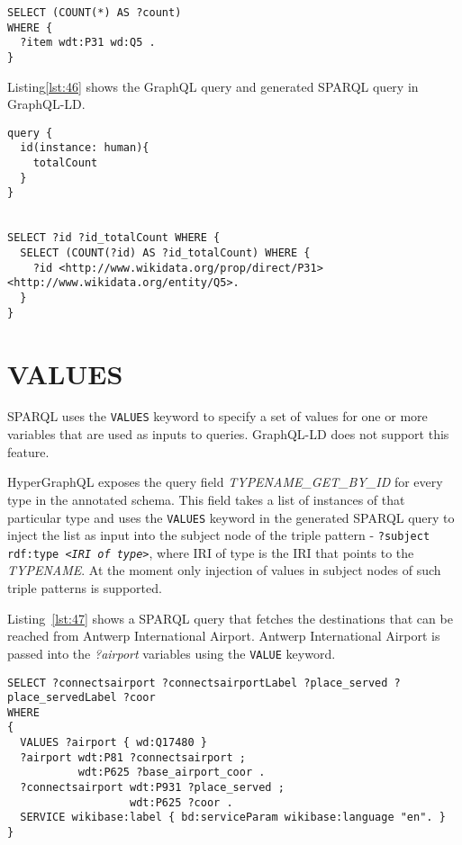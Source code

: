 \begin{minipage}{\linewidth}
\begin{lstlisting}[label=lst:45, caption={SPARQL query showing usage of COUNT}, language=SPARQL]
SELECT (COUNT(*) AS ?count)
WHERE {
  ?item wdt:P31 wd:Q5 .
}
\end{lstlisting}
\end{minipage}

Listing\ref{lst:46} shows the GraphQL query and generated SPARQL query in GraphQL-LD. 

\begin{minipage}{\linewidth}
\begin{lstlisting}[label=lst:46, caption={GraphQL query and generated SPARQL query in GraphQL-LD}, language=SPARQL]
query {
  id(instance: human){
    totalCount
  }
}


SELECT ?id ?id_totalCount WHERE { 
  SELECT (COUNT(?id) AS ?id_totalCount) WHERE { 
    ?id <http://www.wikidata.org/prop/direct/P31> <http://www.wikidata.org/entity/Q5>. 
  } 
}
\end{lstlisting}
\end{minipage}


\section{VALUES}

SPARQL uses the \texttt{VALUES} keyword to specify a set of values for one or more variables that are used as inputs to queries. GraphQL-LD does not support this feature. 

HyperGraphQL exposes the query field \textit{TYPENAME\_GET\_BY\_ID} for every type in the annotated schema. This field takes a list of instances of that particular type and uses the \texttt{VALUES} keyword in the generated SPARQL query to inject the list as input into the subject node of the triple pattern - \texttt{?subject rdf:type \textit{<IRI of type>}}, where IRI of type is the IRI that points to the \textit{TYPENAME}. At the moment only injection of values in subject nodes of such triple patterns is supported.

Listing~\ref{lst:47} shows a SPARQL query that fetches the destinations that can be reached from Antwerp International Airport. Antwerp International Airport is passed into the \textit{?airport} variables using the \texttt{VALUE} keyword.


\begin{minipage}{\linewidth}
\begin{lstlisting}[label=lst:47, caption={SPARQL query showing usage of VALUES}, language=SPARQL]
SELECT ?connectsairport ?connectsairportLabel ?place_served ?place_servedLabel ?coor
WHERE
{
  VALUES ?airport { wd:Q17480 }  
  ?airport wdt:P81 ?connectsairport ;
           wdt:P625 ?base_airport_coor .
  ?connectsairport wdt:P931 ?place_served ;
                   wdt:P625 ?coor .
  SERVICE wikibase:label { bd:serviceParam wikibase:language "en". }
}
\end{lstlisting}
\end{minipage}

